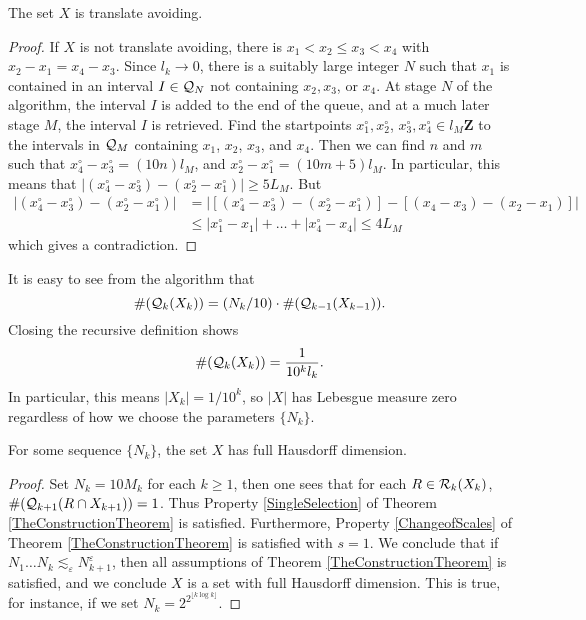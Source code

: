 \begin{lemma}
    The set $X$ is translate avoiding.
\end{lemma}
\begin{proof}
    If $X$ is not translate avoiding, there is $x_1 < x_2 \leq x_3 < x_4$ with $x_2 - x_1 = x_4 - x_3$. Since $l_k \to 0$, there is a suitably large integer $N$ such that $x_1$ is contained in an interval $I \in \operatorname{\mathcal{Q}}_N$ not containing $x_2,x_3$, or $x_4$. At stage $N$ of the algorithm, the interval $I$ is added to the end of the queue, and at a much later stage $M$, the interval $I$ is retrieved. Find the startpoints $x_1^\circ, x_2^\circ$, $x_3^\circ, x_4^\circ \in l_M \mathbf{Z}$ to the intervals in $\operatorname{\mathcal{Q}}_M$ containing $x_1$, $x_2$, $x_3$, and $x_4$. Then we can find $n$ and $m$ such that $x_4^\circ - x_3^\circ = (10n)l_M$, and $x_2^\circ - x_1^\circ = (10m + 5)l_M$. In particular, this means that $|(x_4^\circ - x_3^\circ) - (x_2^\circ - x_1^\circ)| \geq 5L_M$. But
    \begin{align*}
        |(x_4^\circ - x_3^\circ) - (x_2^\circ - x_1^\circ)| &= |[(x_4^\circ - x_3^\circ) - (x_2^\circ - x_1^\circ)] - [(x_4 - x_3) - (x_2 - x_1)]|\\
        &\leq |x_1^\circ - x_1| + \dots + |x_4^\circ - x_4| \leq 4 L_M
    \end{align*}
    which gives a contradiction.
\end{proof}

It is easy to see from the algorithm that
%
\[ \# (\operatorname{\mathcal{Q}}_k(X_k)) = (N_k/10) \cdot \#(\operatorname{\mathcal{Q}}_{k-1}(X_{k-1})). \]
%
Closing the recursive definition shows
%
\[ \#(\operatorname{\mathcal{Q}}_k(X_k)) = \frac{1}{10^k l_k}. \]
%
In particular, this means $|X_k| = 1/10^k$, so $|X|$ has Lebesgue measure zero regardless of how we choose the parameters $\{ N_k \}$. 

\begin{theorem}
    For some sequence $\{ N_k \}$, the set $X$ has full Hausdorff dimension.
\end{theorem}
\begin{proof}
    Set $N_k = 10 M_k$ for each $k \geq 1$, then one sees that for each $R \in \operatorname{\mathcal{R}}_k(X_k)$, $\#(\operatorname{\mathcal{Q}}_{k+1}(R \cap X_{k+1})) = 1$. Thus Property \ref{SingleSelection} of Theorem \ref{TheConstructionTheorem} is satisfied. Furthermore, Property \ref{ChangeofScales} of Theorem \ref{TheConstructionTheorem} is satisfied with $s = 1$. We conclude that if $N_1 \dots N_k \lesssim_\varepsilon N_{k+1}^\varepsilon$, then all assumptions of Theorem \ref{TheConstructionTheorem} is satisfied, and we conclude $X$ is a set with full Hausdorff dimension. This is true, for instance, if we set $N_k = 2^{2^{\lfloor k \log k \rfloor}}$.
\end{proof}

